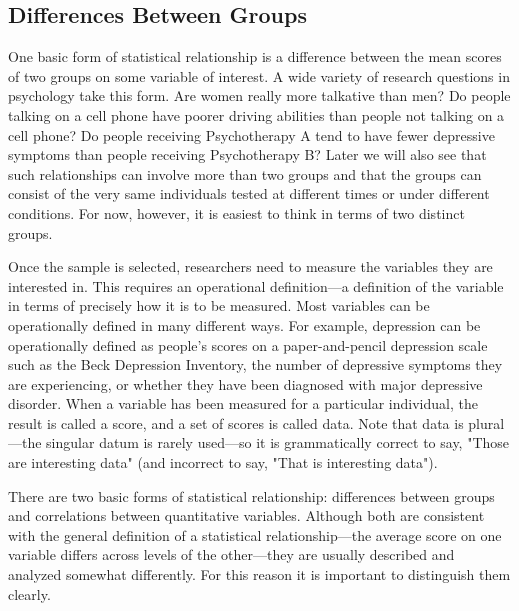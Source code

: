 \subsection{Differences Between Groups}
One basic form of statistical relationship is a difference between the mean scores of two groups on some variable of interest. A wide variety of research questions in psychology take this form. Are women really more talkative than men? Do people talking on a cell phone have poorer driving abilities than people not talking on a cell phone? Do people receiving Psychotherapy A tend to have fewer depressive symptoms than people receiving Psychotherapy B? Later we will also see that such relationships can involve more than two groups and that the groups can consist of the very same individuals tested at different times or under different conditions. For now, however, it is easiest to think in terms of two distinct groups.

 Once the sample is selected, researchers need to measure the variables they are interested in. This requires an operational definition---a definition of the variable in terms of precisely how it is to be measured. Most variables can be operationally defined in many different ways. For example, depression can be operationally defined as people's scores on a paper-and-pencil depression scale such as the Beck Depression Inventory, the number of depressive symptoms they are experiencing, or whether they have been diagnosed with major depressive disorder. When a variable has been measured for a particular individual, the result is called a score, and a set of scores is called data. Note that data is plural---the singular datum is rarely used---so it is grammatically correct to say, "Those are interesting data" (and incorrect to say, "That is interesting data").

 There are two basic forms of statistical relationship: differences between groups and correlations between quantitative variables. Although both are consistent with the general definition of a statistical relationship---the average score on one variable differs across levels of the other---they are usually described and analyzed somewhat differently. For this reason it is important to distinguish them clearly.

